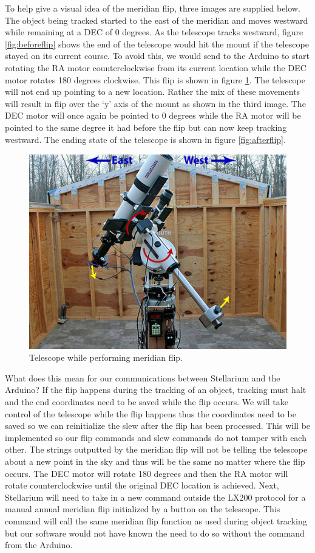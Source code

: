 \documentclass[12pt]{article}
\begin{document}
To help give a visual idea of the meridian flip, three images are supplied below. The object being tracked started to the east of the meridian and moves westward while remaining at a DEC of 0 degrees. As the telescope tracks westward, figure \ref{fig:beforeflip} shows the end of the telescope would hit the mount if the telescope stayed on its current course. To avoid this, we would send to the Arduino to start rotating the RA motor counterclockwise from its current location while the DEC motor rotates 180 degrees clockwise. This flip is shown in figure \ref{fig:duringflip}. The telescope will not end up pointing to a new location. Rather the mix of these movements will result in flip over the ‘y’ axis of the mount as shown in the third image. The DEC motor will once again be pointed to 0 degrees while the RA motor will be pointed to the same degree it had before the flip but can now keep tracking westward. The ending state of the telescope is shown in figure \ref{fig:afterflip}.

\begin{figure}[h]
  \centering
  \includegraphics[width=0.6\linewidth]{duringflip}
  \caption{Telescope while performing meridian flip.}
  \label{fig:duringflip}
\end{figure}

What does this mean for our communications between Stellarium and the Arduino? If the flip happens during the tracking of an object, tracking must halt and the end coordinates need to be saved while the flip occurs. We will take control of the telescope while the flip happens thus the coordinates need to be saved so we can reinitialize the slew after the flip has been processed. This will be implemented so our flip commands and slew commands do not tamper with each other. The strings outputted by the meridian flip will not be telling the telescope about a new point in the sky and thus will be the same no matter where the flip occurs. The DEC motor will rotate 180 degrees and then the RA motor will rotate counterclockwise until the original DEC location is achieved. Next, Stellarium will need to take in a new command outside the LX200 protocol for a manual annual meridian flip initialized by a button on the telescope. This command will call the same meridian flip function as used during object tracking but our software would not have known the need to do so without the command from the Arduino.
\end{document}
